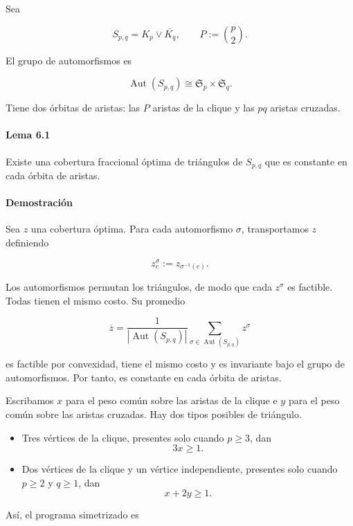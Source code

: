 \documentclass[spanish,11pt,a4paper]{article}
\providecommand{\tightlist}{\setlength{\itemsep}{0pt}\setlength{\parskip}{0pt}}
\begin{document}
Sea

\[
S_{p,q}=K_p\vee\overline{K_q},
\qquad
P:=\binom p2.
\]

El grupo de automorfismos es

\[
\operatorname{Aut}(S_{p,q})
\cong
\mathfrak S_p\times\mathfrak S_q.
\]

Tiene dos órbitas de aristas: las \(P\) aristas de la clique y las
\(pq\) aristas cruzadas.

\paragraph{Lema 6.1}\label{lema-6.1}

Existe una cobertura fraccional óptima de triángulos de \(S_{p,q}\) que
es constante en cada órbita de aristas.

\paragraph{Demostración}\label{demostraciuxf3n-8}

Sea \(z\) una cobertura óptima. Para cada automorfismo \(\sigma\),
transportamos \(z\) definiendo

\[
z^\sigma_e:=z_{\sigma^{-1}(e)}.
\]

Los automorfismos permutan los triángulos, de modo que cada \(z^\sigma\)
es factible. Todas tienen el mismo costo. Su promedio

\[
\overline z
=
\frac{1}{|\operatorname{Aut}(S_{p,q})|}
\sum_{\sigma\in\operatorname{Aut}(S_{p,q})}z^\sigma
\]

es factible por convexidad, tiene el mismo costo y es invariante bajo el
grupo de automorfismos. Por tanto, es constante en cada órbita de
aristas.

Escribamos \(x\) para el peso común sobre las aristas de la clique e
\(y\) para el peso común sobre las aristas cruzadas. Hay dos tipos
posibles de triángulo.

\begin{itemize}
\tightlist
\item
  Tres vértices de la clique, presentes solo cuando \(p\ge3\), dan \[
  3x\ge1.
  \]
\item
  Dos vértices de la clique y un vértice independiente, presentes solo
  cuando \(p\ge2\) y \(q\ge1\), dan \[
  x+2y\ge1.
  \]
\end{itemize}

Así, el programa simetrizado es
\end{document}
